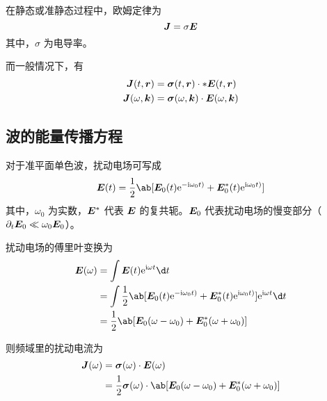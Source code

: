 在静态或准静态过程中，欧姆定律为
\begin{equation}
\bm{J} = \sigma \bm{E}
\end{equation}
其中，$\sigma$ 为电导率。

而一般情况下，有
\begin{equation}\begin{aligned}
\bm{J}(t, \bm{r}) &= \bm{\sigma}(t, \bm{r}) \cdot * \bm{E}(t, \bm{r}) \\
\bm{J}(\omega, \bm{k}) &= \bm{\sigma}(\omega, \bm{k}) \cdot \bm{E}(\omega, \bm{k})
\end{aligned}\end{equation}

\subsection{波的能量传播方程}

对于准平面单色波，扰动电场可写成
\begin{equation}
\vector{E}(t) = \frac{1}{2} \ab[
    \vector{E}_0(t) \eu^{-\im\omega_0 t)}
  + \vector{E}_0^*(t) \eu^{\im\omega_0 t)}
]
\end{equation}
其中，$\omega_0$ 为实数，$\bm{E}^*$ 代表 $\bm{E}$ 的复共轭。$\bm{E}_0$ 代表扰动电场的慢变部分（$\pdv{\bm{E}_0}!{t}\ll\omega_0\bm{E}_0$）。

扰动电场的傅里叶变换为
\begin{equation}\begin{aligned}
\vector{E}(\omega) &= \int \vector{E}(t) \eu^{\im \omega t} \d t \\
&= \int \frac{1}{2} \ab[
    \vector{E}_0(t) \eu^{-\im\omega_0 t)}
  + \vector{E}_0^*(t) \eu^{\im\omega_0 t)}
] \eu^{\im \omega t} \d t \\
&= \frac{1}{2} \ab[
    \vector{E}_0(\omega - \omega_0)
  + \vector{E}_0^*(\omega + \omega_0)
]
\end{aligned}\end{equation}

则频域里的扰动电流为
\begin{equation}\begin{aligned}
\vector{J}(\omega) &= \vector{\sigma}(\omega) \cdot \vector{E}(\omega) \\
&= \frac{1}{2} \vector{\sigma}(\omega) \cdot \ab[
    \vector{E}_0(\omega - \omega_0)
  + \vector{E}_0^*(\omega + \omega_0)
]
\end{aligned}\end{equation}

